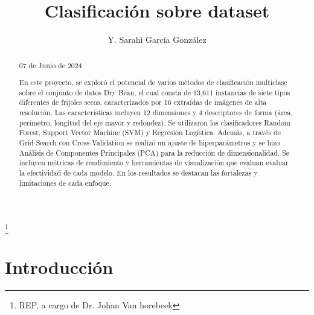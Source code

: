 \documentclass[letterpaper,spanish,reprint,nofootinbib,showkeys,aps]{revtex4-2}
\begin{document}
\title{\Large{\textbf{Clasificación sobre dataset}}}
\author{Y. Sarahi García González}
\thanks{REP, a  cargo de Dr. Johan Van horebeek}



\begin{abstract}
\begin{center}
\small{07 de Junio de 2024}
\end{center}
\vspace{0.6cm}
En este proyecto, se exploró el potencial de varios métodos de clasificación multiclase sobre el conjunto de datos Dry Bean, el cual consta de 13,611 instancias de siete tipos diferentes de frijoles secos, caracterizados por 16 extraídas de imágenes de alta resolución. Las características incluyen 12 dimensiones y 4 descriptores de forma (área, perímetro, longitud del eje mayor y redondez). Se utilizaron los clasificadores Random Forest, Support Vector Machine (SVM) y Regresión Logística. Además, a través de Grid Search con Cross-Validation se realizó un ajuste de hiperparámetros y se hizo Análisis de Componentes Principales (PCA) para la reducción de dimensionalidad. Se incluyen métricas de rendimiento y herramientas de visualización que evaluan evaluar la efectividad de cada modelo. En los resultados se destacan las fortalezas y limitaciones de cada enfoque.
\end{abstract}

\maketitle




\section{Introducción}
\end{document}
